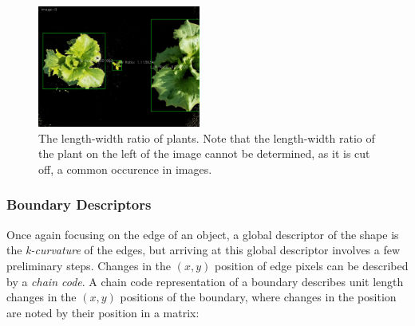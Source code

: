 \documentclass[letterpaper]{article}
\begin{document}
{{\begin{figure}[h!]
	\centering
	\includegraphics[height=4cm]{./figures/shape-lw-ratio.jpg}
	\caption[Shape attribute: Length-Width ratio]{The length-width ratio of plants. Note that the length-width ratio of the plant on the left of the image cannot be determined, as it is cut off, a common occurence in images.}
	\label{fig:shape-area}
\end{figure}

\subsubsection{Boundary Descriptors}
Once again focusing on the edge of an object, a global descriptor of the shape is the \textit{k-curvature} of the edges, but arriving at this global descriptor involves a few preliminary steps. Changes in the $(x,y)$ position of edge pixels can be described by a \textit{chain code}. A chain code representation of a boundary describes unit length changes in the $(x,y)$ positions of the boundary,  where changes in the position are noted by their position in a matrix:

}}
\end{document}
